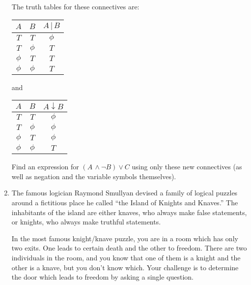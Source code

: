 \begin{enumerate}
\noindent The truth tables for these connectives are:
\medskip

\begin{tabular}{c|c|c}
$A$ & $B$ & $A \,\vert\, B$ \\ \hline
$T$ & $T$ & $\phi$ \\
$T$ & $\phi$ & $T$ \\
$\phi$ & $T$ & $T$ \\
$\phi$ & $\phi$ & $T$ 
\end{tabular}
\hspace{.25 in} and \hspace{.25 in}
\begin{tabular}{c|c|c}
$A$ & $B$ & $A \downarrow B$ \\ \hline
$T$ & $T$ & $\phi$ \\
$T$ & $\phi$ & $\phi$ \\
$\phi$ & $T$ & $\phi$ \\
$\phi$ & $\phi$ & $T$ 
\end{tabular}
\medskip

Find an expression for $(A\, \land {\lnot}B) \lor C$
using only these new connectives (as well as negation and the
variable symbols themselves).



\textbookpagebreak
\workbookpagebreak


\item \label{IKK} The famous logician  Raymond Smullyan devised 
a family of logical puzzles around a fictitious place he called 
 ``the Island of Knights and Knaves.''  The inhabitants of the island are either knaves, who always make false statements, or knights, who always make truthful statements.  

In the most famous knight/knave puzzle, you are in a room which has only two exits.  One leads to certain death and the other to freedom.  There are two 
individuals in the room, and you know that one of them is a knight and the other is a knave, but you don't know which.   Your challenge is to determine the door which leads to freedom by asking a single question.


\end{enumerate}
